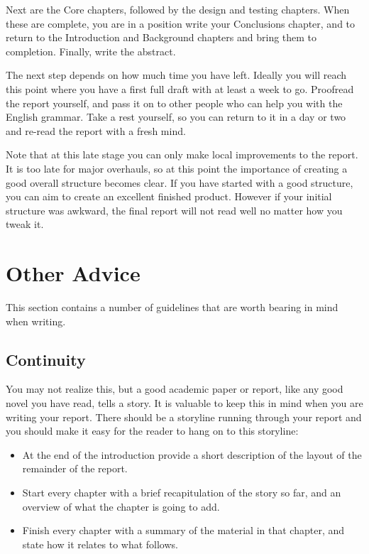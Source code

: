\documentclass[]{final_report}
\begin{document}
Next are the Core chapters, followed by the design and testing chapters. When these are complete, you are in a position write your Conclusions chapter, and to return to the Introduction and Background chapters and bring them to completion. Finally, write the abstract.

The next step depends on how much time you have left. Ideally you will reach this point where you have a first full draft with at least a week to go. Proofread the report yourself, and pass it on to other people who can help you with the English grammar. Take a rest yourself, so you can return to it in a day or two and re-read the report with a fresh mind.

Note that at this late stage you can only make local improvements to the report. It is too late for major overhauls, so at this point the importance of creating a good overall structure becomes clear. If you have started with a good structure, you can aim to create an excellent finished product. However if your initial structure was awkward, the final report will not read well no matter how you tweak it.

\section{Other Advice}

This section contains a number of guidelines that are worth bearing in mind when writing.


\subsection{Continuity}

You may not realize this, but a good academic paper or report, like any good novel you have read, tells a story. It is valuable to keep this in mind when you are writing your report. There should be a storyline running through your report and you should make it easy for the reader to hang on to this storyline:

\begin{itemize}
\item At the end of the introduction provide a short description of the layout of
the remainder of the report.
\item Start every chapter with a brief recapitulation of the story so far, and an
overview of what the chapter is going to add.
\item Finish every chapter with a summary of the material in that chapter, and
state how it relates to what follows.
\end{itemize}
\end{document}
